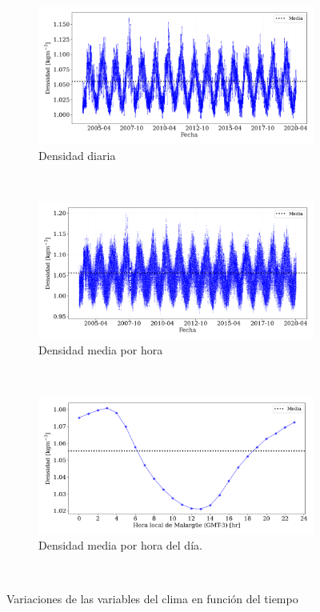 \begin{figure}[H]
	\centering
        \begin{subfigure}[b]{0.8\textwidth}	
			\includegraphics[width=\textwidth]{Graphs/clima/densidad_diaria_v2.png}
			\caption{Densidad diaria}
			\label{fig:densidad_diaria}
        \end{subfigure}\\
        \begin{subfigure}[b]{0.8\textwidth}
			\includegraphics[width=\textwidth]{Graphs/clima/densidad_media_diaria_v2.png}
			\caption{Densidad media por hora}
			\label{fig:densidad_hora}
		\end{subfigure}\\
        \begin{subfigure}[b]{0.8\textwidth}	
			\includegraphics[width=\textwidth]{Graphs/clima/densidad_hod_v2.png}
			\caption{Densidad media por hora del día.}
			\label{fig:area_auger}
        \end{subfigure}\\
  \caption{Variaciones de las variables del clima en función del tiempo}
  \label{fig:clima_p_rho}
\end{figure}



